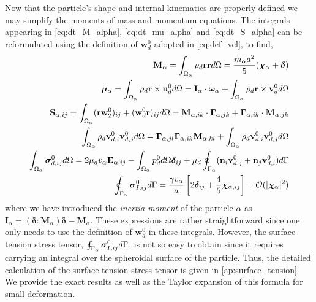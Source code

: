 Now that the particle's shape and internal kinematics are properly defined we may simplify the moments of mass and momentum equations. 
The integrals appearing in \ref{eq:dt_M_alpha}, \ref{eq:dt_mu_alpha} and \ref{eq:dt_S_alpha} can be reformulated using the definition of $\textbf{w}_d^0$ adopted in \ref{eq:def_vel}, to find, 
\begin{align}
    \textbf{M}_\alpha 
    = \intO{ \rho_d \textbf{rr} }
    = \frac{m_\alpha a^2}{5} (\bm\chi_\alpha+\bm\delta)\\
    \bm\mu_\alpha 
    = \intO{ \rho_d \textbf{r}\times\textbf{u}_d^0 }
    = \textbf{I}_\alpha \cdot \bm\omega_\alpha
    + \intO{ \rho_d \textbf{r}\times\textbf{v}_d^0 }
    \\
    \label{eq:S_def}
    \textbf{S}_{\alpha,ij} = \intO{(\textbf{rw}_ 2^0 )_{ij}+ (\textbf{w}_d^0 \textbf{r})_{ij}} 
    = \textbf{M}_{\alpha,ik} \cdot \bm\Gamma_{\alpha,jk}
        +  \bm\Gamma_{\alpha,ik} \cdot \textbf{M}_{\alpha,jk}
    \\
    \intO{\rho_d \textbf{v}_{d,i}^0\textbf{v}_{d,j}^0}
    = \bm\Gamma_{\alpha,jl}\bm\Gamma_{\alpha,ik} \textbf{M}_{\alpha,kl}  
    +\intO{\rho_d \textbf{v}_{d,i}^0\textbf{v}_{d,j}^0}
    \label{eq:ww_def}
    \\
    \label{eq:sigma_d_def}
    \intO{\bm\sigma_{d,ij}^0}
    =
    2 \mu_d v_\alpha \textbf{E}_{\alpha,ij}
    - \intO{p_d^0} \bm\delta_{ij}
    + \mu_d \intS{(\textbf{n}_i \textbf{v}_{d,j}^0 + \textbf{n}_j \textbf{v}_{d,i}^0)}
    \\
    \intS{\bm\sigma_{I,ij}^0}
    = \frac{\gamma v_\alpha }{a} \left[
        2\bm\delta_{ij} 
        + \frac{4  }{5} \bm\chi_{\alpha,ij}
    \right]
    +\mathcal{O}(|\bm\chi_\alpha|^2)
\end{align}
where we have introduced the \textit{inertia moment} of the particle $\alpha$ as $\textbf{I}_\alpha = (\bm\delta : \textbf{M}_\alpha)\bm\delta - \textbf{M}_\alpha$. 
These expressions are rather straightforward since one only needs to use the definition of $\textbf{w}_d^0$ in these integrals. 
However, the surface tension stress tensor, $\oint_{\Gamma_{\alpha}} \bm\sigma_{I,ij}^0 d\Gamma$, is not so easy to obtain since it requires carrying an integral over the spheroidal surface of the particle.
Thus, the detailed calculation of the surface tension stress tensor is given in \ref{ap:surface_tension}. 
We provide the exact results as well as the Taylor expansion of this formula for small deformation. 

